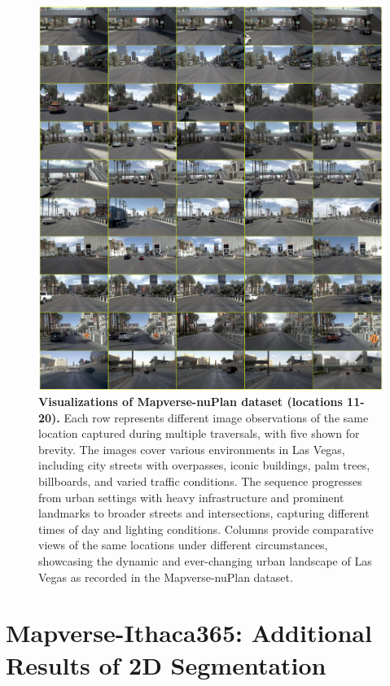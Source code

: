 \begin{figure}
    \centering
    \includegraphics[width=1\linewidth]{figs_compressed/vegas-2_compressed.pdf}
    \caption{\textbf{Visualizations of Mapverse-nuPlan dataset (locations 11-20).} Each row represents different image observations of the same location captured during multiple traversals, with five shown for brevity. The images cover various environments in Las Vegas, including city streets with overpasses, iconic buildings, palm trees, billboards, and varied traffic conditions. The sequence progresses from urban settings with heavy infrastructure and prominent landmarks to broader streets and intersections, capturing different times of day and lighting conditions. Columns provide comparative views of the same locations under different circumstances, showcasing the dynamic and ever-changing urban landscape of Las Vegas as recorded in the Mapverse-nuPlan dataset.}
    \label{fig:nuplan-2}
\end{figure}


\clearpage


\section{Mapverse-Ithaca365: Additional Results of 2D Segmentation}
